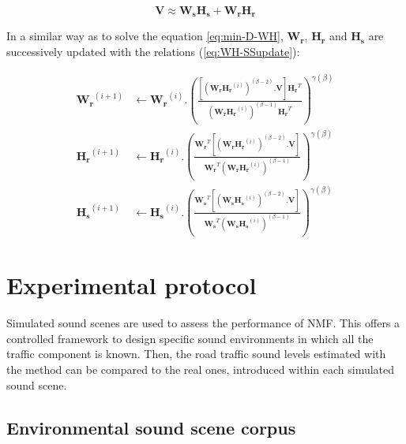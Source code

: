 \documentclass[twocolumn,a4paper,10pt]{article}
\begin{document}
\begin{equation}
\mathbf{V} \approx \mathbf{W_s H_s}+ \mathbf{W_r H_r}
\end{equation}

In a similar way as to solve the equation \ref{eq:min-D-WH}, $\mathbf{W_r}$, $\mathbf{H_r}$ and $\mathbf{H_s}$ are successively updated with the relations (\ref{eq:WH-SSupdate}):

{\scriptsize
\begin{subequations}\label{eq:WH-SSupdate}
\begin{align}
\mathbf{W_r}^{(i+1)} &\leftarrow \mathbf{W_r}^{(i)}.\left(\frac{\left[\left(\mathbf{W_r H_r}^{(i)} \right)^{(\beta-2)}.\mathbf{V} \right]\mathbf{H_r}^T}{\left(\mathbf{W_r H_r}^{(i)} \right)^{(\beta-1)}\mathbf{H_r}^T}\right)^{\gamma(\beta)}\label{eq:W_r_SS}\\
\mathbf{H_r}^{(i+1)} &\leftarrow \mathbf{H_r}^{(i)}.\left(\frac{\mathbf{W_r}^T \left[\left(\mathbf{W_r H_r}^{(i)} \right)^{(\beta-2)}.\mathbf{V} \right]}{\mathbf{W_r}^T \left(\mathbf{W_r H_r}^{(i)} \right)^{(\beta-1)}}\right)^{\gamma(\beta)}\label{eq:H_r_SS}\\
\mathbf{H_s}^{(i+1)} &\leftarrow \mathbf{H_s}^{(i)}.\left(\frac{\mathbf{W_s}^T \left[\left(\mathbf{W_s H_s}^{(i)} \right)^{(\beta-2)}.\mathbf{V} \right]}{\mathbf{W_s}^T \left(\mathbf{W_s H_s}^{(i)} \right)^{(\beta-1)}}\right)^{\gamma(\beta)}\label{eq:H_s_SS}
\end{align}
\end{subequations}}


\section{Experimental protocol}\label{part:protocol}

Simulated sound scenes are used to assess the performance of NMF. This offers a controlled framework to design specific sound environments in which all the traffic component is known. Then, the road traffic sound levels estimated with the method can be compared to the real ones, introduced within each simulated sound scene.

\subsection{Environmental sound scene corpus}
\end{document}
